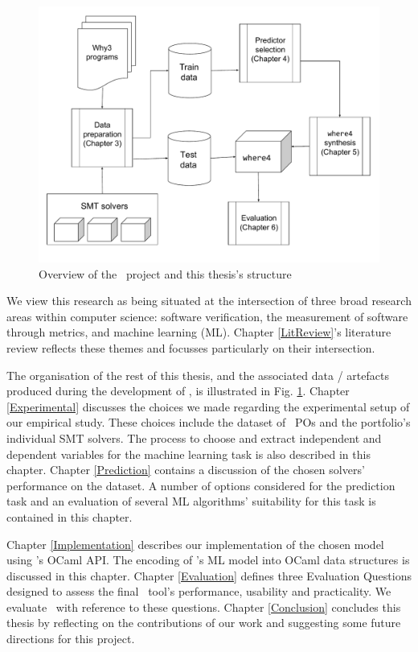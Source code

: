 \begin{figure}
	\centering
	\includegraphics[width=0.9\linewidth]{Figures/intoduction}
	\caption{Overview of the \where~project and this thesis's structure}
	\label{fig:introduction}
\end{figure}

We view this research as being situated at the intersection of three broad research areas within computer science: software verification, the measurement of software through metrics, and machine learning (ML). 
Chapter \ref{LitReview}'s literature review reflects these themes and focusses particularly on their intersection.  

The organisation of the rest of this thesis, and the associated data / artefacts produced during the development of \where, is illustrated in Fig. \ref{fig:introduction}. 
Chapter \ref{Experimental} discusses the choices we made regarding the experimental setup of our empirical study. 
These choices include the dataset of \why~POs and the portfolio's individual SMT solvers.
The process to choose and extract independent and dependent variables for the machine learning task is also described in this chapter.
Chapter \ref{Prediction} contains a discussion of the chosen solvers' performance on the dataset. 
A number of options considered for the prediction task and an evaluation of several ML algorithms' suitability for this task is contained in this chapter.

Chapter \ref{Implementation} describes our implementation of the chosen model using \why's OCaml API.
The encoding of \where's ML model into OCaml data structures is discussed in this chapter.
Chapter \ref{Evaluation} defines three Evaluation Questions designed to assess the final \where~tool's performance, usability and practicality.
We evaluate \where~with reference to these questions.
Chapter \ref{Conclusion} concludes this thesis by reflecting on the contributions of our work and suggesting some future directions for this project.



